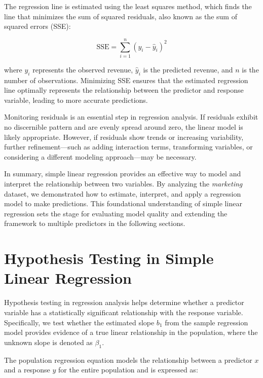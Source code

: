 \documentclass[
]{book}
\theoremstyle{definition}
\theoremstyle{definition}
\theoremstyle{definition}
\theoremstyle{definition}
\theoremstyle{remark}
\begin{document}
The regression line is estimated using the least squares method, which finds the line that minimizes the sum of squared residuals, also known as the sum of squared errors (SSE):

\begin{equation} 
\text{SSE} = \sum_{i=1}^{n} (y_i - \hat{y}_i)^2
\label{eq:sse}
\end{equation}

where \(y_i\) represents the observed revenue, \(\hat{y}_i\) is the predicted revenue, and \(n\) is the number of observations. Minimizing SSE ensures that the estimated regression line optimally represents the relationship between the predictor and response variable, leading to more accurate predictions.

Monitoring residuals is an essential step in regression analysis. If residuals exhibit no discernible pattern and are evenly spread around zero, the linear model is likely appropriate. However, if residuals show trends or increasing variability, further refinement---such as adding interaction terms, transforming variables, or considering a different modeling approach---may be necessary.

In summary, simple linear regression provides an effective way to model and interpret the relationship between two variables. By analyzing the \emph{marketing} dataset, we demonstrated how to estimate, interpret, and apply a regression model to make predictions. This foundational understanding of simple linear regression sets the stage for evaluating model quality and extending the framework to multiple predictors in the following sections.

\section*{Hypothesis Testing in Simple Linear Regression}\label{hypothesis-testing-in-simple-linear-regression}

Hypothesis testing in regression analysis helps determine whether a predictor variable has a statistically significant relationship with the response variable. Specifically, we test whether the estimated slope \(b_1\) from the sample regression model provides evidence of a true linear relationship in the population, where the unknown slope is denoted as \(\beta_1\).

The population regression equation models the relationship between a predictor \(x\) and a response \(y\) for the entire population and is expressed as:
\end{document}
